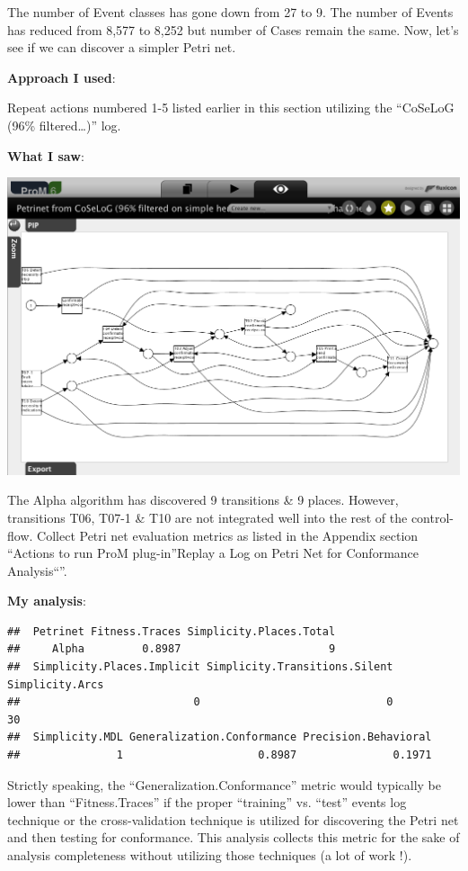 \documentclass[]{article}
\begin{document}
The number of Event classes has gone down from 27 to 9. The number of
Events has reduced from 8,577 to 8,252 but number of Cases remain the
same. Now, let's see if we can discover a simpler Petri net.

\textbf{Approach I used}:

Repeat actions numbered 1-5 listed earlier in this section utilizing the
``CoSeLoG (96\% filtered\ldots{})'' log.

\textbf{What I saw}:

\includegraphics{CoSeLoG_Step_05_Filter96_PetriNet_Alpha.png}

The Alpha algorithm has discovered 9 transitions \& 9 places. However,
transitions T06, T07-1 \& T10 are not integrated well into the rest of
the control-flow. Collect Petri net evaluation metrics as listed in the
Appendix section ``Actions to run ProM plug-in''Replay a Log on Petri
Net for Conformance Analysis``''.

\textbf{My analysis}:

\begin{verbatim}
##  Petrinet Fitness.Traces Simplicity.Places.Total
##     Alpha         0.8987                       9
##  Simplicity.Places.Implicit Simplicity.Transitions.Silent Simplicity.Arcs
##                           0                             0              30
##  Simplicity.MDL Generalization.Conformance Precision.Behavioral
##               1                     0.8987               0.1971
\end{verbatim}

Strictly speaking, the ``Generalization.Conformance'' metric would
typically be lower than ``Fitness.Traces'' if the proper ``training''
vs. ``test'' events log technique or the cross-validation technique is
utilized for discovering the Petri net and then testing for conformance.
This analysis collects this metric for the sake of analysis completeness
without utilizing those techniques (a lot of work !).
\end{document}
